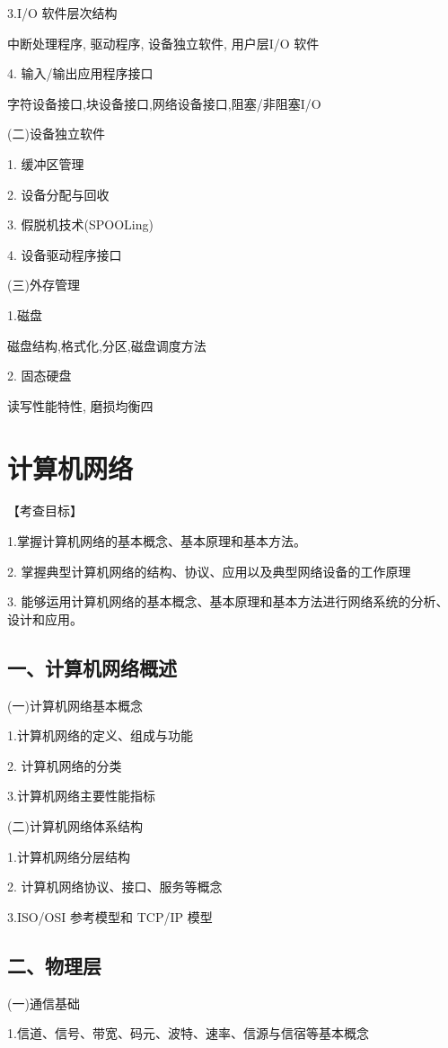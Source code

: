 \documentclass[10pt]{article}
\begin{document}
3.I/O 软件层次结构

中断处理程序, 驱动程序, 设备独立软件, 用户层I/O 软件

4. 输入/输出应用程序接口

字符设备接口,块设备接口,网络设备接口,阻塞/非阻塞I/O

(二)设备独立软件

1. 缓冲区管理

2. 设备分配与回收

3. 假脱机技术(SPOOLing)

4. 设备驱动程序接口

(三)外存管理

1.磁盘

磁盘结构,格式化,分区,磁盘调度方法

2. 固态硬盘

读写性能特性, 磨损均衡四

\section*{计算机网络 }

【考查目标】 

1.掌握计算机网络的基本概念、基本原理和基本方法。 

2. 掌握典型计算机网络的结构、协议、应用以及典型网络设备的工作原理 

3. 能够运用计算机网络的基本概念、基本原理和基本方法进行网络系统的分析、设计和应用。

\subsection*{一、计算机网络概述}

(一)计算机网络基本概念

1.计算机网络的定义、组成与功能

2. 计算机网络的分类

3.计算机网络主要性能指标

(二)计算机网络体系结构

1.计算机网络分层结构

2. 计算机网络协议、接口、服务等概念

3.ISO/OSI 参考模型和 TCP/IP 模型

\subsection*{二、物理层}

(一)通信基础

1.信道、信号、带宽、码元、波特、速率、信源与信宿等基本概念
\end{document}
